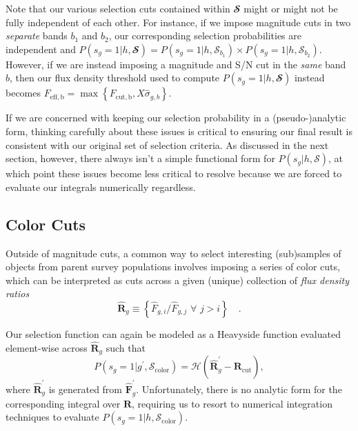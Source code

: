 \documentclass[a4paper,fleqn,usenatbib,english]{mnras}
\newcommand{\rom}[2]{\ensuremath{#1_{\mathrm{#2}}}} %
\begin{document}
Note that our various selection cuts contained within $\mathbfcal{S}$ might or might not be fully independent of each other. For instance, if we impose magnitude cuts in two \textit{separate} bands $b_1$ and $b_2$, our corresponding selection probabilities are independent and $P(s_g=1|h,\mathbfcal{S}) = P(s_g=1|h,\mathcal{S}_{b_1}) \times P(s_g=1|h,\mathcal{S}_{b_2})$. However, if we are instead imposing a magnitude and S/N cut in the \textit{same} band $b$, then our flux density threshold used to compute $P(s_g=1|h,\mathbfcal{S})$ instead becomes $\rom{F}{eff,b}=\max\left\lbrace \rom{F}{cut,b}, X\hat{\sigma}_{g,b} \right\rbrace$.

If we are concerned with keeping our selection probability in a (pseudo-)analytic form, thinking carefully about these issues is critical to ensuring our final result is consistent with our original set of selection criteria. As discussed in the next section, however, there always isn't a simple functional form for $P(s_g|h,\mathcal{S})$, at which point these issues become less critical to resolve because we are forced to evaluate our integrals numerically regardless.

\subsection{Color Cuts}
\label{subsec:sel_color}

Outside of magnitude cuts, a common way to select interesting (sub)samples of objects from parent survey populations involves imposing a series of color cuts, which can be interpreted as cuts across a given (unique) collection of \textit{flux density ratios}
\begin{equation}
\mathbf{\hat{R}}_g \equiv \left\lbrace \hat{F}_{g,i}/\hat{F}_{g,j} \,\, \forall \,\, j>i \right\rbrace \quad .
\end{equation}

Our selection function can again be modeled as a Heavyside function evaluated element-wise across $\mathbf{\hat{R}}_g$ such that
\begin{equation}
P(s_g=1|g^\prime,\rom{\mathcal{S}}{color}) = \mathcal{H}(\mathbf{\hat{R}}_g^\prime-\rom{\mathbf{R}}{cut}),
\end{equation}
where $\mathbf{\hat{R}}_g^\prime$ is generated from $\mathbf{\hat{F}}_g^\prime$. Unfortunately, there is no analytic form for the corresponding integral over $\mathbf{R}$, requiring us to resort to numerical integration techniques to evaluate $P(s_g=1|h,\rom{\mathcal{S}}{color})$.
\end{document}
